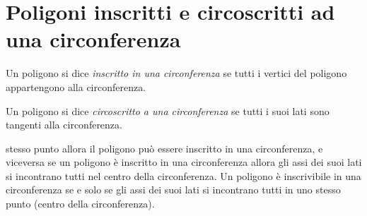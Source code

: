 \section{Poligoni inscritti e circoscritti ad una 
circonferenza}\label{sect:poligoni_circonferenza}

\begin{definizione}
Un poligono si dice \emph{inscritto in una circonferenza} se tutti i 
vertici del poligono appartengono alla circonferenza.
\end{definizione}

\begin{definizione}
Un poligono si dice \emph{circoscritto a una circonferenza} se tutti 
i suoi lati sono tangenti alla circonferenza.
\end{definizione}


\begin{inaccessibleblock}
 \begin{figure}[htb]
	\centering
\end{figure}
\end{inaccessibleblock}

\begin{teorema}
stesso punto allora il poligono può essere inscritto in una 
circonferenza, e viceversa se un poligono è inscritto in una 
circonferenza allora gli assi dei suoi lati si incontrano tutti nel 
centro della circonferenza.
Un poligono è inscrivibile in una circonferenza se e solo se gli assi 
dei suoi lati si incontrano tutti in uno stesso punto (centro della 
circonferenza).
\end{teorema}


